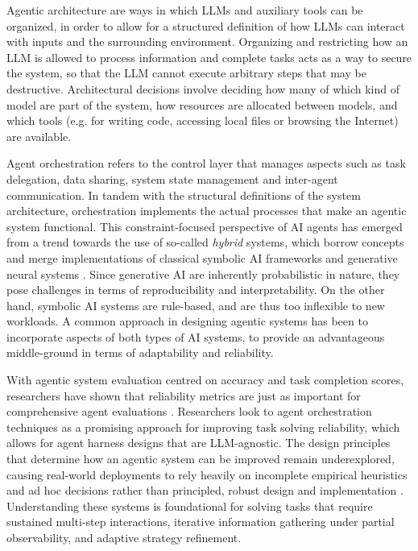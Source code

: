 \documentclass[conference]{IEEEtran}
\begin{document}
Agentic architecture are ways in which LLMs and auxiliary tools can be organized, in order to allow
for a structured definition of how LLMs can interact with inputs and the surrounding environment.
Organizing and restricting how an LLM is allowed to process information and complete tasks acts as a
way to secure the system, so that the LLM cannot execute arbitrary steps that may be destructive.
Architectural decisions involve deciding how many of which kind of model are part of the system, how
resources are allocated between models, and which tools (e.g. for writing code, accessing local
files or browsing the Internet) are available.

Agent orchestration refers to the control layer that manages aspects such as task delegation,
data sharing, system state management and inter-agent communication.
In tandem with the structural definitions of the system architecture, orchestration implements the
actual processes that make an agentic system functional.
This constraint-focused perspective of AI agents has emerged from a trend towards the use of
so-called \emph{hybrid} systems, which borrow concepts and merge implementations of classical symbolic
AI frameworks and generative neural systems \cite{ali_agentic_2025}.
Since generative AI are inherently probabilistic in nature, they pose challenges in terms of
reproducibility and interpretability.
On the other hand, symbolic AI systems are rule-based, and are thus too inflexible to new workloads.
A common approach in designing agentic systems has been to incorporate aspects of both types of AI
systems, to provide an advantageous middle-ground in terms of adaptability and reliability.

With agentic system evaluation centred on accuracy and task completion scores, researchers have
shown that reliability metrics are just as important for comprehensive agent evaluations
\cite{rabanser_towards_2026}.
Researchers look to agent orchestration
techniques as a promising approach for improving task solving reliability, which allows for agent
harness designs that are LLM-agnostic.
The design principles that determine how an agentic system can be improved remain underexplored,
causing real-world deployments to rely heavily on incomplete empirical heuristics and ad hoc decisions
rather than principled, robust design and implementation \cite{kim_towards_2026}. 
Understanding these systems is foundational for solving tasks that require
sustained multi-step interactions, iterative information gathering under partial observability,
and adaptive strategy refinement.
\end{document}
